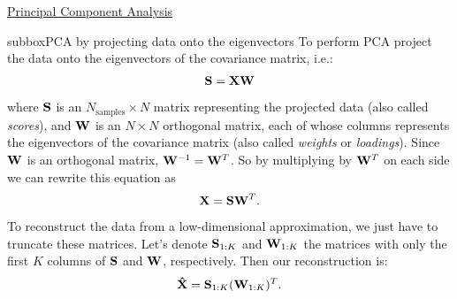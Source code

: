 \begin{textbox}{\href{https://compneuro.neuromatch.io/tutorials/W1D4_DimensionalityReduction/student/W1D4_Tutorial2.html}{Principal Component Analysis } }

\begin{subbox}{subbox}{PCA by projecting data onto the eigenvectors
}
\scriptsize
To perform PCA project the data onto the eigenvectors of the covariance matrix, i.e.:
\begin{align}
\bf S = X W
\end{align}
where $\bf S$ is an $N_\text{samples} \times N$ matrix representing the projected data (also called \textit{scores}), and $\bf W$ is an $N\times N$ orthogonal matrix, each of whose columns represents the eigenvectors of the covariance matrix (also called \textit{weights} or \textit{loadings}). 
Since $\bf W$ is an orthogonal matrix, ${\bf W}^{-1} = {\bf W}^T$. So by multiplying by ${\bf W}^T$ on each side we can rewrite this equation as  
\begin{align}
{\bf X = S W}^T.
\end{align}
To reconstruct the data from a low-dimensional approximation, we just have to truncate these matrices.  Let's denote ${\bf S}_{1:K}$ and ${\bf W}_{1:K}$ the matrices with only the first $K$ columns of $\bf S$ and $\bf W$, respectively. Then our reconstruction is:
\begin{align}
{\bf \hat X = S}_{1:K} ({\bf W}_{1:K})^T.
\end{align}
\end{subbox}
\end{textbox}
